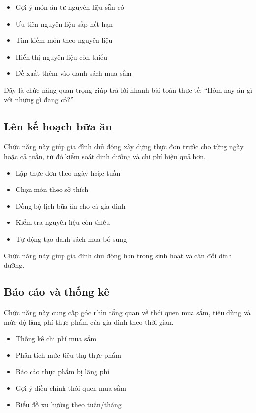 \documentclass[12pt,a4paper]{report}
\begin{document}
\begin{itemize}
    \item Gợi ý món ăn từ nguyên liệu sẵn có 
    \item Ưu tiên nguyên liệu sắp hết hạn 
    \item Tìm kiếm món theo nguyên liệu 
    \item Hiển thị nguyên liệu còn thiếu 
    \item Đề xuất thêm vào danh sách mua sắm 
\end{itemize}

Đây là chức năng quan trọng giúp trả lời nhanh bài toán thực tế: “Hôm nay ăn gì với những gì đang có?”  

\subsection{Lên kế hoạch bữa ăn}
Chức năng này giúp gia đình chủ động xây dựng thực đơn trước cho từng ngày hoặc cả tuần, từ đó kiểm soát dinh dưỡng và chi phí hiệu quả hơn.  

\begin{itemize}
    \item Lập thực đơn theo ngày hoặc tuần 
    \item Chọn món theo sở thích 
    \item Đồng bộ lịch bữa ăn cho cả gia đình 
    \item Kiểm tra nguyên liệu còn thiếu 
    \item Tự động tạo danh sách mua bổ sung 
\end{itemize}

Chức năng này giúp gia đình chủ động hơn trong sinh hoạt và cân đối dinh dưỡng.  

\subsection{Báo cáo và thống kê}
Chức năng này cung cấp góc nhìn tổng quan về thói quen mua sắm, tiêu dùng và mức độ lãng phí thực phẩm của gia đình theo thời gian.  

\begin{itemize}
    \item Thống kê chi phí mua sắm 
    \item Phân tích mức tiêu thụ thực phẩm 
    \item Báo cáo thực phẩm bị lãng phí 
    \item Gợi ý điều chỉnh thói quen mua sắm 
    \item Biểu đồ xu hướng theo tuần/tháng 
\end{itemize}
\end{document}
